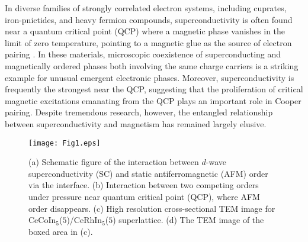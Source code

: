 \documentclass[twocolumn,preprintnumbers,amsmath,amssymb,prl]{revtex4}
\begin{document}
\maketitle



In diverse families of strongly correlated electron systems, including cuprates,  iron-pnictides,  and heavy fermion compounds, superconductivity is often found near a quantum critical point (QCP) where a magnetic phase vanishes in the limit of zero temperature, pointing to a magnetic glue as the source of electron pairing \cite{Mathur,Shibauchi2014,Keimer}.   In these materials,  microscopic coexistence of superconducting and magnetically ordered phases both involving the same charge carriers is a striking example for unusual emergent electronic phases.  Moreover,  superconductivity is frequently the strongest near the QCP,  suggesting that the proliferation of critical magnetic excitations emanating from the QCP plays an important role in Cooper pairing.   Despite tremendous research, however,  the entangled relationship between superconductivity and magnetism has remained largely elusive.    


\begin{figure}[b]
\begin{center}
\texttt{[image: Fig1.eps]}
\caption{
(a) Schematic figure of the interaction between $d$-wave superconductivity (SC) and static antiferromagnetic (AFM) order  via the interface.  (b) Interaction between two competing orders under pressure near quantum critical point (QCP), where  AFM order disappears. 
(c) High resolution cross-sectional TEM image for CeCoIn$_5$($5$)/CeRhIn$_5$($5$) superlattice. (d) The TEM image of the boxed area in (c). %
}
 \end{center}
 \end{figure}
\end{document}
